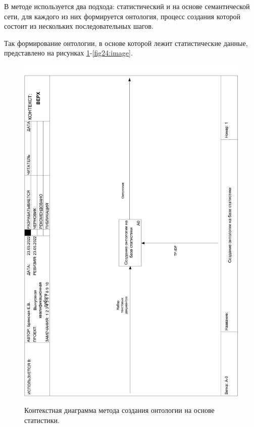 \newpage

В методе используется два подхода: статистический и на основе семантической сети, для каждого из них формируется онтология, процесс создания которой состоит из нескольких последовательных шагов.

Так формирование онтологии, в основе которой лежит статистические данные, представлено на рисунках \ref{fig23:image}-\ref{fig24:image}. 
\begin{figure}[h]
	\begin{center}
		{\includegraphics[scale = 0.39, angle=-90, page=1]{img/idef0/pdf/ontology.pdf}}
		\caption{Контекстная диаграмма метода создания онтологии на основе статистики.}
		\label{fig23:image}
	\end{center}
\end{figure}

